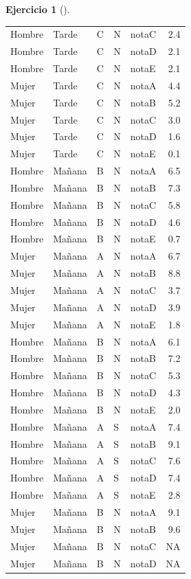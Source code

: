 \documentclass[
  a4paper,
]{scrreport}
\theoremstyle{definition}
\newtheorem{exercise}{Ejercicio}[chapter]
\theoremstyle{remark}
\begin{document}
\begin{exercise}[]
\begin{enumerate}
\begin{tcolorbox}
\begin{longtable}[]{@{}lllllr@{}}
  Hombre & Tarde & C & N & notaC & 2.4 \\
  Hombre & Tarde & C & N & notaD & 2.1 \\
  Hombre & Tarde & C & N & notaE & 2.1 \\
  Mujer & Tarde & C & N & notaA & 4.4 \\
  Mujer & Tarde & C & N & notaB & 5.2 \\
  Mujer & Tarde & C & N & notaC & 3.0 \\
  Mujer & Tarde & C & N & notaD & 1.6 \\
  Mujer & Tarde & C & N & notaE & 0.1 \\
  Hombre & Mañana & B & N & notaA & 6.5 \\
  Hombre & Mañana & B & N & notaB & 7.3 \\
  Hombre & Mañana & B & N & notaC & 5.8 \\
  Hombre & Mañana & B & N & notaD & 4.6 \\
  Hombre & Mañana & B & N & notaE & 0.7 \\
  Mujer & Mañana & A & N & notaA & 6.7 \\
  Mujer & Mañana & A & N & notaB & 8.8 \\
  Mujer & Mañana & A & N & notaC & 3.7 \\
  Mujer & Mañana & A & N & notaD & 3.9 \\
  Mujer & Mañana & A & N & notaE & 1.8 \\
  Hombre & Mañana & B & N & notaA & 6.1 \\
  Hombre & Mañana & B & N & notaB & 7.2 \\
  Hombre & Mañana & B & N & notaC & 5.3 \\
  Hombre & Mañana & B & N & notaD & 4.3 \\
  Hombre & Mañana & B & N & notaE & 2.0 \\
  Hombre & Mañana & A & S & notaA & 7.4 \\
  Hombre & Mañana & A & S & notaB & 9.1 \\
  Hombre & Mañana & A & S & notaC & 7.6 \\
  Hombre & Mañana & A & S & notaD & 7.4 \\
  Hombre & Mañana & A & S & notaE & 2.8 \\
  Mujer & Mañana & B & N & notaA & 9.1 \\
  Mujer & Mañana & B & N & notaB & 9.6 \\
  Mujer & Mañana & B & N & notaC & NA \\
  Mujer & Mañana & B & N & notaD & NA \\

\end{longtable}
\end{tcolorbox}
\end{enumerate}
\end{exercise}
\end{document}
